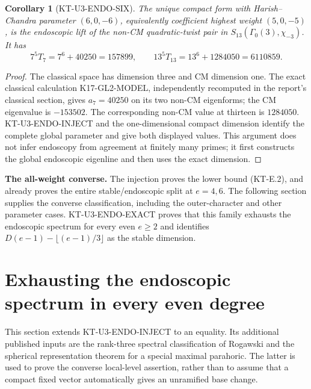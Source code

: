 \documentclass[11pt,a4paper]{article}
\newtheorem{corollary}[theorem]{Corollary}
\theoremstyle{definition}
\renewcommand{\paragraph}[1]{\par\smallskip\noindent\textbf{#1}\quad\ignorespaces}
\begin{document}
\begin{corollary}[KT-U3-ENDO-SIX]
The unique compact form with Harish--Chandra parameter
$(6,0,-6)$, equivalently coefficient highest weight
$(5,0,-5)$, is the endoscopic lift of the non-CM quadratic-twist
pair in $S_{13}(\Gamma_0(3),\chi_{-3})$.
It has
\[
  7^5T_7=7^6+40250=157899,
  \qquad
  13^5T_{13}=13^6+1284050=6110859.
\]
\end{corollary}
\begin{proof}
The classical space has dimension three and CM dimension one.
The exact classical calculation K17-GL2-MODEL, independently
recomputed in the report's classical section, gives $a_7=40250$
on its two non-CM eigenforms; the CM eigenvalue is $-153502$.
The corresponding non-CM value at thirteen is $1284050$.
KT-U3-ENDO-INJECT and the one-dimensional compact dimension
identify the complete global parameter and give both displayed
values. This argument does not infer endoscopy from agreement
at finitely many primes; it first constructs the global
endoscopic eigenline and then uses the exact dimension.
\end{proof}

\paragraph{The all-weight converse.}
The injection proves the lower bound (KT-E.2), and already
proves the entire stable/endoscopic split at $e=4,6$.
The following section supplies the converse classification,
including the outer-character and other parameter cases.
KT-U3-ENDO-EXACT proves that this family exhausts the endoscopic
spectrum for every even $e\ge2$ and identifies
$D(e-1)-\lfloor(e-1)/3\rfloor$ as the stable dimension.



\section{Exhausting the endoscopic spectrum in every even degree}
\label{sec:kt-endoscopic-converse}

This section extends KT-U3-ENDO-INJECT to an equality. Its additional
published inputs are the rank-three spectral classification of Rogawski
and the spherical representation theorem for a special maximal parahoric.
The latter is used to prove the converse local-level assertion, rather
than to assume that a compact fixed vector automatically gives an
unramified base change.
\end{document}
